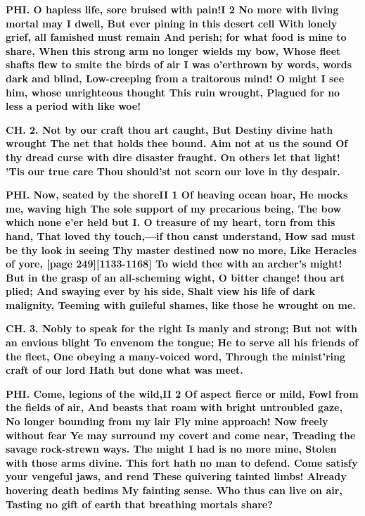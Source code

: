 \documentclass[11pt,letter]{book}
\begin{document}
\par \textbf{PHI. O hapless life, sore bruised with pain!I 2 No more with living mortal may I dwell, But ever pining in this desert cell With lonely grief, all famished must remain And perish; for what food is mine to share, When this strong arm no longer wields my bow, Whose fleet shafts flew to smite the birds of air I was o’erthrown by words, words dark and blind, Low-creeping from a traitorous mind! O might I see him, whose unrighteous thought This ruin wrought, Plagued for no less a period with like woe!}
\par 

\par \textbf{CH. 2. Not by our craft thou art caught, But Destiny divine hath wrought The net that holds thee bound. Aim not at us the sound Of thy dread curse with dire disaster fraught. On others let that light! ’Tis our true care Thou should’st not scorn our love in thy despair.}
\par 

\par \textbf{PHI. Now, seated by the shoreII 1 Of heaving ocean hoar, He mocks me, waving high The sole support of my precarious being, The bow which none e’er held but I. O treasure of my heart, torn from this hand, That loved thy touch,—if thou canst understand, How sad must be thy look in seeing Thy master destined now no more, Like Heracles of yore, [page 249][1133-1168] To wield thee with an archer’s might! But in the grasp of an all-scheming wight, O bitter change! thou art plied; And swaying ever by his side, Shalt view his life of dark malignity, Teeming with guileful shames, like those he wrought on me.}
\par 

\par \textbf{CH. 3. Nobly to speak for the right Is manly and strong; But not with an envious blight To envenom the tongue; He to serve all his friends of the fleet, One obeying a many-voiced word, Through the minist’ring craft of our lord Hath but done what was meet.}
\par 

\par \textbf{PHI. Come, legions of the wild,II 2 Of aspect fierce or mild, Fowl from the fields of air, And beasts that roam with bright untroubled gaze, No longer bounding from my lair Fly mine approach! Now freely without fear Ye may surround my covert and come near, Treading the savage rock-strewn ways. The might I had is no more mine, Stolen with those arms divine. This fort hath no man to defend. Come satisfy your vengeful jaws, and rend These quivering tainted limbs! Already hovering death bedims My fainting sense. Who thus can live on air, Tasting no gift of earth that breathing mortals share?}
\par 
\end{document}
